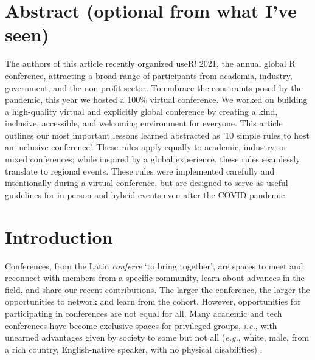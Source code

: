 \documentclass[10pt,letterpaper]{article}
\begin{document}
\section*{Abstract (optional from what I've seen)}

The authors of this article recently organized useR! 2021, the annual global R conference, attracting a broad range of participants from academia, industry, government, and the non-profit sector. To embrace the constraints posed by the pandemic, this year we hosted a 100\% virtual conference. We worked on building a high-quality virtual and explicitly global conference by creating a kind, inclusive, accessible, and welcoming environment for everyone. 
This article outlines our most important lessons learned abstracted as '10 simple rules to host an inclusive conference'. These rules apply equally to academic, industry, or mixed conferences; while inspired by a global experience, these rules seamlessly translate to regional events. These rules were implemented carefully and intentionally during a virtual conference, but are designed to serve as useful guidelines for in-person and hybrid events even after the COVID pandemic. 


\linenumbers

\section*{Introduction}

Conferences, from the Latin \textit{conferre} `to bring together', are spaces to meet and reconnect with members from a specific community, learn about advances in the field, and share our recent contributions.
The larger the conference, the larger the opportunities to network and learn from the cohort.
However, opportunities for participating in conferences are not equal for all. 
Many academic and tech conferences have become exclusive spaces for privileged groups, \textit{i.e.}, with unearned advantages given by society to some but not all (\textit{e.g.}, white, male, from a rich country, English-native speaker, with no physical disabilities) \cite{arendDisparityConferenceRegistration2019, biggsAcademicConferenceChilly2018, depickerRethinkingInclusionDisability2020a, irishIncreasingParticipationUsing2020}.
\end{document}
